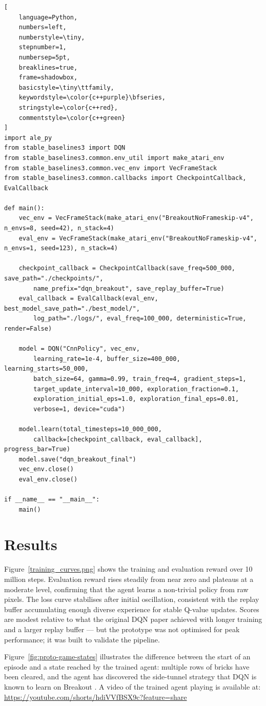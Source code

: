 \begin{lstlisting}[
    language=Python,
    numbers=left,
    numberstyle=\tiny,
    stepnumber=1,
    numbersep=5pt,
    breaklines=true,
    frame=shadowbox,
    basicstyle=\tiny\ttfamily,
    keywordstyle=\color{c++purple}\bfseries,
    stringstyle=\color{c++red},
    commentstyle=\color{c++green}
]
import ale_py
from stable_baselines3 import DQN
from stable_baselines3.common.env_util import make_atari_env
from stable_baselines3.common.vec_env import VecFrameStack
from stable_baselines3.common.callbacks import CheckpointCallback, EvalCallback

def main():
    vec_env = VecFrameStack(make_atari_env("BreakoutNoFrameskip-v4", n_envs=8, seed=42), n_stack=4)
    eval_env = VecFrameStack(make_atari_env("BreakoutNoFrameskip-v4", n_envs=1, seed=123), n_stack=4)

    checkpoint_callback = CheckpointCallback(save_freq=500_000, save_path="./checkpoints/",
        name_prefix="dqn_breakout", save_replay_buffer=True)
    eval_callback = EvalCallback(eval_env, best_model_save_path="./best_model/",
        log_path="./logs/", eval_freq=100_000, deterministic=True, render=False)

    model = DQN("CnnPolicy", vec_env,
        learning_rate=1e-4, buffer_size=400_000, learning_starts=50_000,
        batch_size=64, gamma=0.99, train_freq=4, gradient_steps=1,
        target_update_interval=10_000, exploration_fraction=0.1,
        exploration_initial_eps=1.0, exploration_final_eps=0.01,
        verbose=1, device="cuda")

    model.learn(total_timesteps=10_000_000,
        callback=[checkpoint_callback, eval_callback], progress_bar=True)
    model.save("dqn_breakout_final")
    vec_env.close()
    eval_env.close()

if __name__ == "__main__":
    main()
\end{lstlisting}

\section{Results}

{\color{red}
Figure~\ref{training_curves.png} shows the training and evaluation reward over 10 million steps. Evaluation reward rises steadily from near zero and plateaus at a moderate level, confirming that the agent learns a non-trivial policy from raw pixels. The loss curve stabilises after initial oscillation, consistent with the replay buffer accumulating enough diverse experience for stable Q-value updates. Scores are modest relative to what the original DQN paper achieved with longer training and a larger replay buffer --- but the prototype was not optimised for peak performance; it was built to validate the pipeline.

Figure~\ref{fig:proto-game-states} illustrates the difference between the start of an episode and a state reached by the trained agent: multiple rows of bricks have been cleared, and the agent has discovered the side-tunnel strategy that DQN is known to learn on Breakout \citep{mnih2015human}. A video of the trained agent playing is available at: \url{https://youtube.com/shorts/hdiVVfBSX9c?feature=share}
}

